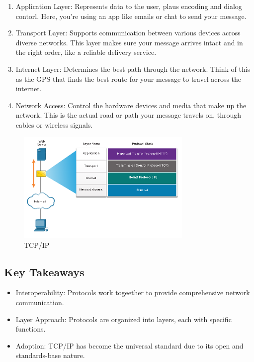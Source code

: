 \documentclass[a4paper,11pt]{article}
\begin{document}
\begin{enumerate}
    \item Application Layer: Represents data to the user, plaus encoding and dialog contorl. Here, you're using an app like emails or chat to send your message.\\
    \item Transport Layer: Supports communication between various devices across diverse networks. This layer makes sure your message arrives intact and in the right order, like a reliable delivery service.\\
    \item Internet Layer: Determines the best path through the network. Think of this as the GPS that finds the best route for your message to travel across the internet.\\
    \item Network Access: Control the hardware devices and media that make up the network. This is the actual road or path your message travels on, through cables or wireless signals.\\
\end{enumerate}

\begin{figure}[h!]
    \centering
    \includegraphics[width=0.75\textwidth]{5.png}
    \caption{TCP/IP}
    \label{fig:cap1}
\end{figure}

\subsection{Key Takeaways}
\begin{itemize}
    \item Interoperability: Protocols work togeether to provide comprehensive network communication.\\
    \item Layer Approach: Protocols are organized into layers, each with specific functions.\\
    \item  Adoption: TCP/IP has become the universal standard due to its open and standards-base nature.\\
\end{itemize}
\end{document}
